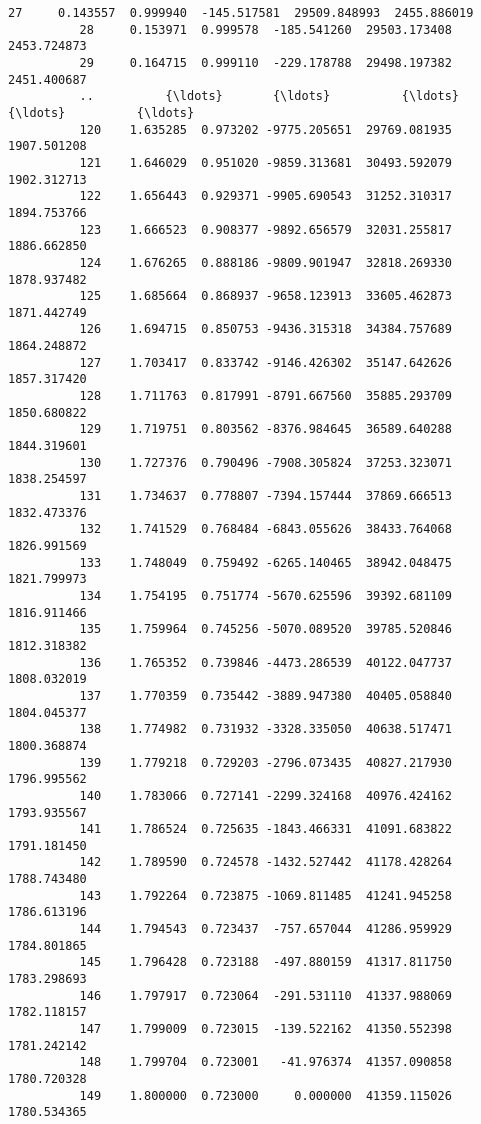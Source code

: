 \documentclass[11pt]{article}
\begin{document}
\begin{Verbatim}[commandchars=\\\{\}]
          27     0.143557  0.999940  -145.517581  29509.848993  2455.886019   
          28     0.153971  0.999578  -185.541260  29503.173408  2453.724873   
          29     0.164715  0.999110  -229.178788  29498.197382  2451.400687   
          ..          {\ldots}       {\ldots}          {\ldots}           {\ldots}          {\ldots}   
          120    1.635285  0.973202 -9775.205651  29769.081935  1907.501208   
          121    1.646029  0.951020 -9859.313681  30493.592079  1902.312713   
          122    1.656443  0.929371 -9905.690543  31252.310317  1894.753766   
          123    1.666523  0.908377 -9892.656579  32031.255817  1886.662850   
          124    1.676265  0.888186 -9809.901947  32818.269330  1878.937482   
          125    1.685664  0.868937 -9658.123913  33605.462873  1871.442749   
          126    1.694715  0.850753 -9436.315318  34384.757689  1864.248872   
          127    1.703417  0.833742 -9146.426302  35147.642626  1857.317420   
          128    1.711763  0.817991 -8791.667560  35885.293709  1850.680822   
          129    1.719751  0.803562 -8376.984645  36589.640288  1844.319601   
          130    1.727376  0.790496 -7908.305824  37253.323071  1838.254597   
          131    1.734637  0.778807 -7394.157444  37869.666513  1832.473376   
          132    1.741529  0.768484 -6843.055626  38433.764068  1826.991569   
          133    1.748049  0.759492 -6265.140465  38942.048475  1821.799973   
          134    1.754195  0.751774 -5670.625596  39392.681109  1816.911466   
          135    1.759964  0.745256 -5070.089520  39785.520846  1812.318382   
          136    1.765352  0.739846 -4473.286539  40122.047737  1808.032019   
          137    1.770359  0.735442 -3889.947380  40405.058840  1804.045377   
          138    1.774982  0.731932 -3328.335050  40638.517471  1800.368874   
          139    1.779218  0.729203 -2796.073435  40827.217930  1796.995562   
          140    1.783066  0.727141 -2299.324168  40976.424162  1793.935567   
          141    1.786524  0.725635 -1843.466331  41091.683822  1791.181450   
          142    1.789590  0.724578 -1432.527442  41178.428264  1788.743480   
          143    1.792264  0.723875 -1069.811485  41241.945258  1786.613196   
          144    1.794543  0.723437  -757.657044  41286.959929  1784.801865   
          145    1.796428  0.723188  -497.880159  41317.811750  1783.298693   
          146    1.797917  0.723064  -291.531110  41337.988069  1782.118157   
          147    1.799009  0.723015  -139.522162  41350.552398  1781.242142   
          148    1.799704  0.723001   -41.976374  41357.090858  1780.720328   
          149    1.800000  0.723000     0.000000  41359.115026  1780.534365   
          

\end{Verbatim}
\end{document}
